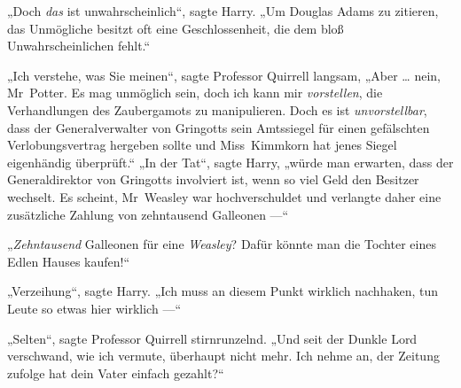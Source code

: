 „Doch \emph{das} ist unwahrscheinlich“, sagte Harry.
„Um Douglas Adams zu zitieren, das Unmögliche besitzt oft eine Geschlossenheit, die dem bloß Unwahrscheinlichen fehlt.“

„Ich verstehe, was Sie meinen“, sagte Professor Quirrell langsam,
„Aber … nein, Mr~Potter. Es mag unmöglich sein, doch ich kann mir \emph{vorstellen}, die Verhandlungen des Zaubergamots zu manipulieren. Doch es ist \emph{unvorstellbar}, dass der Generalverwalter von Gringotts sein Amtssiegel für einen gefälschten Verlobungsvertrag hergeben sollte und Miss~Kimmkorn hat jenes Siegel eigenhändig überprüft.“
„In der Tat“, sagte Harry, „würde man erwarten, dass der Generaldirektor von Gringotts involviert ist, wenn so viel Geld den Besitzer wechselt. Es scheint, Mr~Weasley war hochverschuldet und verlangte daher eine zusätzliche Zahlung von zehntausend Galleonen —“

„\emph{Zehntausend} Galleonen für eine \emph{Weasley}? Dafür könnte man die Tochter eines Edlen Hauses kaufen!“

„Verzeihung“, sagte Harry.
„Ich muss an diesem Punkt wirklich nachhaken, tun Leute so etwas hier wirklich —“

„Selten“, sagte Professor Quirrell stirnrunzelnd.
„Und seit der Dunkle Lord verschwand, wie ich vermute, überhaupt nicht mehr. Ich nehme an, der Zeitung zufolge hat dein Vater einfach gezahlt?“

